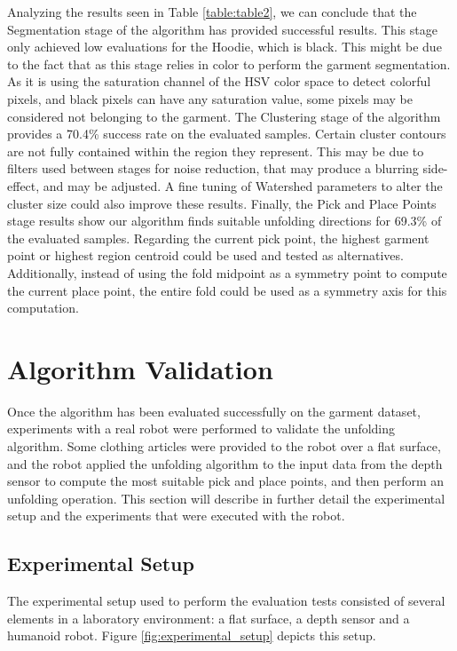 Analyzing the results seen in Table \ref{table:table2}, we can conclude that the Segmentation stage of the algorithm has provided successful results. This stage only achieved low evaluations for the Hoodie, which is black. This might be due to the fact that as this stage relies in color to perform the garment segmentation. As it is using the saturation channel of the HSV color space to detect colorful pixels, and black pixels can have any  saturation value, some pixels may be considered not belonging to the garment. The Clustering stage of the algorithm provides a 70.4\% success rate on the evaluated samples. Certain cluster contours are not fully contained within the region they represent. This may be due to filters used between stages for noise reduction, that may produce a blurring side-effect, and may be adjusted. A fine tuning of Watershed parameters to alter the cluster size could also improve these results. Finally, the Pick and Place Points stage results show our algorithm finds suitable unfolding directions for 69.3\% of the evaluated samples. Regarding the current pick point, the highest garment point or highest region centroid could be used and tested as alternatives. Additionally, instead of using the fold midpoint as a symmetry point to compute the current place point, the entire fold could be used as a symmetry axis for this computation. 

\section{Algorithm Validation}
\label{experiments:validation}

Once the algorithm has been evaluated successfully on the garment dataset, experiments with a real robot were performed to validate the unfolding algorithm. Some clothing articles were provided to the robot over a flat surface, and the robot applied the unfolding algorithm to the input data from the depth sensor to compute the most suitable pick and place points, and then perform an unfolding operation. This section will describe in further detail the experimental setup and the experiments that were executed with the robot.

\subsection{Experimental Setup}
\label{experiments:experimental_setup}

The experimental setup used to perform the evaluation tests consisted of several elements in a laboratory environment: a flat surface, a depth sensor and a humanoid robot. Figure \ref{fig:experimental_setup} depicts this setup.

